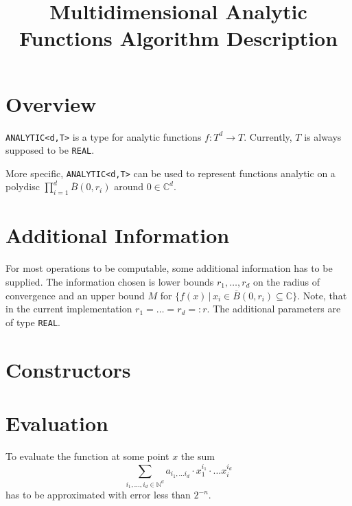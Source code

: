 \documentclass[]{article}
\title{Multidimensional Analytic Functions Algorithm Description}
\newcommand{\CC}{\mathbb C}
\newcommand{\NN}{\mathbb N}
\newcommand{\code}{\texttt}
\begin{document}
\section{Overview}
\code{ANALYTIC<d,T>} is a type for analytic functions $f: T^d \to T$.
Currently, $T$ is always supposed to be \code{REAL}.

More specific, \code{ANALYTIC<d,T>} can be used to represent functions analytic on a polydisc $\prod_{i=1}^d \overline B(0, r_i)$ around $0 \in \CC^d$. 
\section{Additional Information}
For most operations to be computable, some additional information has to be supplied.
The information chosen is lower bounds $r_1, \dots, r_d$ on the radius of convergence and an upper bound $M$ for $\{f(x) \, | \, x_i \in \overline{B}(0, r_i) \subseteq \CC \}$.  
Note, that in the current implementation $r_1 = \dots = r_d =: r$.
The additional parameters are of type \code{REAL}.
\section{Constructors}

\section{Evaluation}
To evaluate the function at some point $x$ the sum
$$ \sum_{i_1, \dots, i_d \in \NN^d} a_{i_1, \dots i_d} \cdot x_1^{i_1} \cdot \dots x_i^{i_d} $$
has to be approximated with error less than $2^{-n}$.
\end{document}
